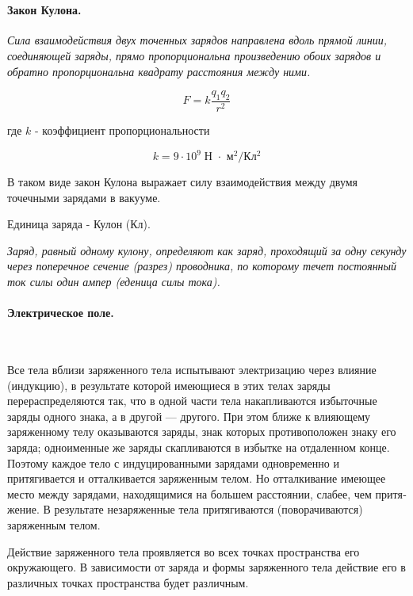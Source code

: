 \documentclass[a4paper,12pt]{article}
\begin{document}
		\

		\paragraph{Закон Кулона.} \textit{Сила взаимодействия двух точенных зарядов 
		направлена вдоль прямой линии, соединяющей заряды, прямо пропорциональна произведению 
		обоих зарядов и обратно пропорциональна квадрату расстояния между ними.} 

		\begin{equation}
			F = k \frac{q_1 q_2}{r^2} 
		\end{equation}

		где $k$ - коэффициент пропорциональности

		\begin{equation*}
			k = 9 \cdot 10^9 \; \text{Н $\cdot$ м$^2$/Кл$^2$}
		\end{equation*}

		В таком виде закон Кулона выражает силу взаимодействия между двумя точечными
		зарядами в вакууме.

		Единица заряда - Кулон (Кл).

		\textit{Заряд, равный одному кулону, определяют как заряд, проходящий за одну секунду
		через поперечное сечение (разрез) проводника, по которому течет постоянный ток силы 
		один ампер (еденица силы тока).}



		\clearpage
		\paragraph{Электрическое поле.} \

		Все тела вблизи заряженного тела испытывают электризацию через влияние (индукцию),
		в результате которой имеющиеся в этих телах заряды перераспределяются так, что в
		одной части тела накапливаются избыточные заряды одного знака, а в другой — другого.
		При этом ближе к влияющему заряженному телу оказываются заряды, знак которых 
		противоположен знаку его заряда; одноименные же заряды скапливаются в избытке на
		отдаленном конце. Поэтому каждое тело с индуцированными зарядами одновременно и 
		притягивается и отталкивается заряженным телом. Но отталкивание имеющее место между
		зарядами, находящимися на большем расстоянии, слабее, чем притя­жение. В результате
		незаряженные тела притягиваются (поворачиваются) заряженным телом.

		Действие заряженного тела проявляется во всех точках пространства его окружающего.
		В зависимости от заряда и формы заряженного тела действие его в различных точках
		пространства будет различным.
\end{document}
